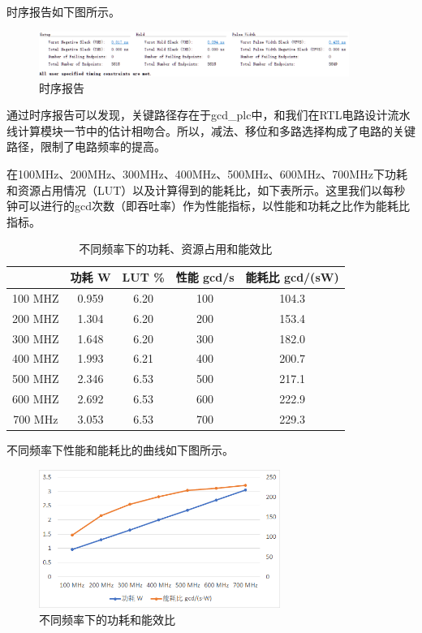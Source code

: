 \documentclass[12pt]{article}
\begin{document}
时序报告如下图所示。

\begin{figure}[H]
\begin{center}
\includegraphics[width=0.9\textwidth]{./yhc_hp/700m_timing.png}
\caption{时序报告}
\label{700m_timing}
\end{center}
\end{figure}

通过时序报告可以发现，关键路径存在于gcd\_plc中，和我们在RTL电路设计流水线计算模块一节中的估计相吻合。所以，减法、移位和多路选择构成了电路的关键路径，限制了电路频率的提高。

在100MHz、200MHz、300MHz、400MHz、500MHz、600MHz、700MHz下功耗和资源占用情况（LUT）以及计算得到的能耗比，如下表所示。这里我们以每秒钟可以进行的gcd次数（即吞吐率）作为性能指标，以性能和功耗之比作为能耗比指标。

\begin{table}[H]
\centering
\begin{tabular}{ccccc}
\hline 
& 功耗 W & LUT \%  & 性能 gcd/s & 能耗比 gcd/(sW) \\
\hline 
100 MHZ & 0.959 & 6.20 & 100 & 104.3 \\
200 MHZ & 1.304 & 6.20 & 200 & 153.4 \\
300 MHZ & 1.648 & 6.20 & 300 & 182.0 \\
400 MHZ & 1.993 & 6.21 & 400 & 200.7 \\
500 MHZ & 2.346 & 6.53 & 500 & 217.1 \\
600 MHZ & 2.692 & 6.53 & 600 & 222.9 \\
700 MHz & 3.053 & 6.53 & 700 & 229.3 \\
\hline 
\end{tabular}
\caption{不同频率下的功耗、资源占用和能效比}
\label{hp_power_table}
\end{table}

不同频率下性能和能耗比的曲线如下图所示。
\begin{figure}[H]
\begin{center}
\includegraphics[width=0.7\textwidth]{./yhc_hp/power_table.png}
\caption{不同频率下的功耗和能效比}
\end{center}
\end{figure}
\end{document}
